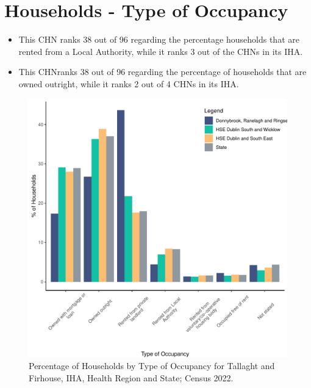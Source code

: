 \documentclass{article}
\begin{document}
\section{Households - Type of Occupancy}\label{sect:Households}
\begin{itemize}
\item This CHN ranks  38 out of 96 regarding the percentage households that are rented from a Local Authority, while it ranks  3 out of the CHNs in its IHA. 
\item This CHNranks  38 out of 96 regarding the percentage of households that are owned outright, while it ranks   2 out of 4 CHNs in its IHA.
\end{itemize}
\begin{figure}[H]
	\centering
	\includegraphics[width = 140mm]{../figures/HouseholdsED.pdf}
	\caption{Percentage of Households by Type of Occupancy for Tallaght and Firhouse, IHA, Health Region and State; Census 2022.}
	\label{fig:vbnv}
	\end{figure}
\end{document}
